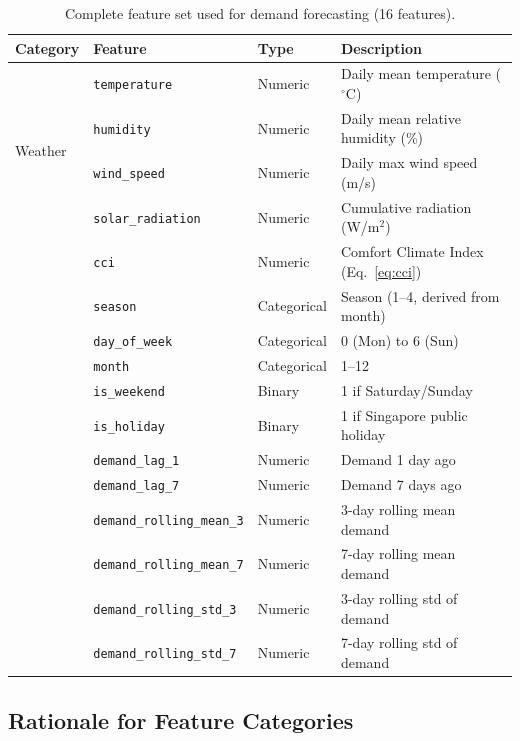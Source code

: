 \begin{table}[H]
\centering
\caption{Complete feature set used for demand forecasting (16 features).}
\label{tab:feature_set}
\small
\begin{tabular}{@{}llll@{}}
\toprule
\textbf{Category} & \textbf{Feature} & \textbf{Type} & \textbf{Description} \\
\midrule
\multirow{4}{*}{Weather} 
  & \texttt{temperature} & Numeric & Daily mean temperature ($^\circ$C) \\
  & \texttt{humidity} & Numeric & Daily mean relative humidity (\%) \\
  & \texttt{wind\_speed} & Numeric & Daily max wind speed (m/s) \\
  & \texttt{solar\_radiation} & Numeric & Cumulative radiation (W/m$^2$) \\
\addlinespace
\multirow{2}{*}{Derived}
  & \texttt{cci} & Numeric & Comfort Climate Index (Eq.~\ref{eq:cci}) \\
  & \texttt{season} & Categorical & Season (1--4, derived from month) \\
\addlinespace
\multirow{4}{*}{Temporal}
  & \texttt{day\_of\_week} & Categorical & 0 (Mon) to 6 (Sun) \\
  & \texttt{month} & Categorical & 1--12 \\
  & \texttt{is\_weekend} & Binary & 1 if Saturday/Sunday \\
  & \texttt{is\_holiday} & Binary & 1 if Singapore public holiday \\
\addlinespace
\multirow{6}{*}{Autoregressive}
  & \texttt{demand\_lag\_1} & Numeric & Demand 1 day ago \\
  & \texttt{demand\_lag\_7} & Numeric & Demand 7 days ago \\
  & \texttt{demand\_rolling\_mean\_3} & Numeric & 3-day rolling mean demand \\
  & \texttt{demand\_rolling\_mean\_7} & Numeric & 7-day rolling mean demand \\
  & \texttt{demand\_rolling\_std\_3} & Numeric & 3-day rolling std of demand \\
  & \texttt{demand\_rolling\_std\_7} & Numeric & 7-day rolling std of demand \\
\bottomrule
\end{tabular}
\end{table}

\subsection{Rationale for Feature Categories}

